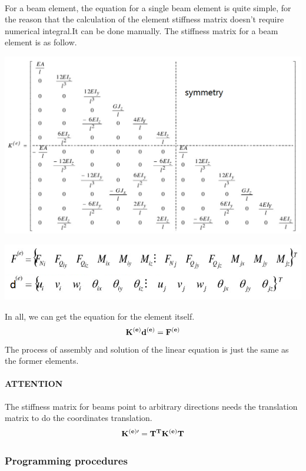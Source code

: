 \documentclass[UTF8]{ctexbook}
\begin{document}
\paragraph{}
For a beam element, the equation for a single beam element is quite simple, for the reason that the calculation of the element stiffness matrix doesn't require numerical integral.It can be done manually.
The stiffness matrix for a beam element is as follow.
\begin{center}
\includegraphics[width=1.0\textwidth]{beam1.png}
\end{center}
\begin{center}
\includegraphics[width=1.0\textwidth]{beam2.png}
\end{center}
In all, we can get the equation for the element itself.
\begin{equation}
{\bf K^{(e)}d^{(e)}=F^{(e)}}
\end{equation}
The process of assembly and solution of the linear equation is just the same as the former elements.
\paragraph{ATTENTION} The stiffness matrix for beams point to arbitrary directions needs the translation matrix to do the coordinates translation.
\begin{equation}
{\bf K^{(e)\prime}=T^{T}K^{(e)}T}
\end{equation}
\subsubsection{Programming procedures}
\end{document}
